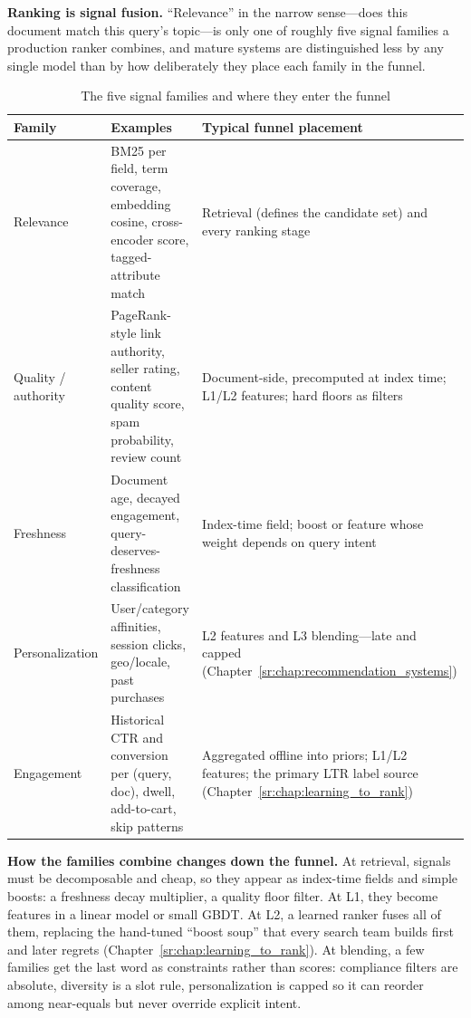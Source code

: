 \textbf{Ranking is signal fusion.} ``Relevance'' in the narrow sense---does this document match this query's topic---is only one of roughly five signal families a production ranker combines, and mature systems are distinguished less by any single model than by how deliberately they place each family in the funnel.

\begin{table}[H]
\centering
\small
\caption{The five signal families and where they enter the funnel}
\label{sr:tab:signals}
\begin{tabularx}{\textwidth}{lXX}
\toprule
\textbf{Family} & \textbf{Examples} & \textbf{Typical funnel placement} \\
\midrule
Relevance & BM25 per field, term coverage, embedding cosine, cross-encoder score, tagged-attribute match & Retrieval (defines the candidate set) and every ranking stage \\
Quality / authority & PageRank-style link authority, seller rating, content quality score, spam probability, review count & Document-side, precomputed at index time; L1/L2 features; hard floors as filters \\
Freshness & Document age, decayed engagement, query-deserves-freshness classification & Index-time field; boost or feature whose weight depends on query intent \\
Personalization & User/category affinities, session clicks, geo/locale, past purchases & L2 features and L3 blending---late and capped (Chapter~\ref{sr:chap:recommendation_systems}) \\
Engagement & Historical CTR and conversion per (query, doc), dwell, add-to-cart, skip patterns & Aggregated offline into priors; L1/L2 features; the primary LTR label source (Chapter~\ref{sr:chap:learning_to_rank}) \\
\bottomrule
\end{tabularx}
\end{table}

\textbf{How the families combine changes down the funnel.} At retrieval, signals must be decomposable and cheap, so they appear as index-time fields and simple boosts: a freshness decay multiplier, a quality floor filter. At L1, they become features in a linear model or small GBDT. At L2, a learned ranker fuses all of them, replacing the hand-tuned ``boost soup'' that every search team builds first and later regrets (Chapter~\ref{sr:chap:learning_to_rank}). At blending, a few families get the last word as constraints rather than scores: compliance filters are absolute, diversity is a slot rule, personalization is capped so it can reorder among near-equals but never override explicit intent.

